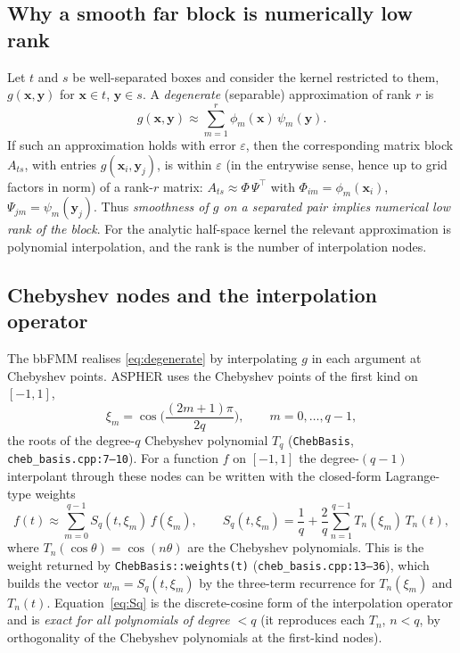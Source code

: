 \documentclass[11pt,a4paper]{article}
\newcommand{\xx}{\mathbf{x}}
\newcommand{\yy}{\mathbf{y}}
\newcommand{\code}[1]{\texttt{#1}}
\theoremstyle{definition}
\theoremstyle{remark}
\begin{document}
\subsection{Why a smooth far block is numerically low rank}

Let $t$ and $s$ be well-separated boxes and consider the kernel restricted to
them, $g(\xx,\yy)$ for $\xx\in t$, $\yy\in s$. A \emph{degenerate} (separable)
approximation of rank $r$ is
\begin{equation}
  g(\xx,\yy)\approx \sum_{m=1}^{r} \phi_m(\xx)\,\psi_m(\yy).
  \label{eq:degenerate}
\end{equation}
If such an approximation holds with error $\varepsilon$, then the corresponding
matrix block $A_{ts}$, with entries $g(\xx_i,\yy_j)$, is within $\varepsilon$ (in
the entrywise sense, hence up to grid factors in norm) of a rank-$r$ matrix:
$A_{ts}\approx \Phi\,\Psi^\top$ with $\Phi_{im}=\phi_m(\xx_i)$,
$\Psi_{jm}=\psi_m(\yy_j)$. Thus \emph{smoothness of $g$ on a separated pair
implies numerical low rank of the block}. For the analytic half-space kernel the
relevant approximation is polynomial interpolation, and the rank is the number
of interpolation nodes.

\subsection{Chebyshev nodes and the interpolation operator}
\label{sec:cheb}

The bbFMM realises \eqref{eq:degenerate} by interpolating $g$ in each argument at
Chebyshev points. ASPHER uses the Chebyshev points of the first kind on
$[-1,1]$,
\begin{equation}
  \xi_m = \cos\!\Big(\frac{(2m+1)\pi}{2q}\Big), \qquad m=0,\dots,q-1,
  \label{eq:cheb-nodes}
\end{equation}
the roots of the degree-$q$ Chebyshev polynomial $T_q$ (\code{ChebBasis},
\code{cheb\_basis.cpp:7--10}). For a function $f$ on $[-1,1]$ the degree-$(q{-}1)$
interpolant through these nodes can be written with the closed-form Lagrange-type
weights
\begin{equation}
  f(t) \approx \sum_{m=0}^{q-1} S_q(t,\xi_m)\, f(\xi_m),
  \qquad
  S_q(t,\xi_m) = \frac{1}{q} + \frac{2}{q}\sum_{n=1}^{q-1} T_n(\xi_m)\,T_n(t),
  \label{eq:Sq}
\end{equation}
where $T_n(\cos\theta)=\cos(n\theta)$ are the Chebyshev polynomials. This is the
weight returned by \code{ChebBasis::weights(t)} (\code{cheb\_basis.cpp:13--36}),
which builds the vector $w_m=S_q(t,\xi_m)$ by the three-term recurrence for
$T_n(\xi_m)$ and $T_n(t)$. Equation~\eqref{eq:Sq} is the discrete-cosine form of
the interpolation operator and is \emph{exact for all polynomials of degree
$<q$} (it reproduces each $T_n$, $n<q$, by orthogonality of the Chebyshev
polynomials at the first-kind nodes).
\end{document}
